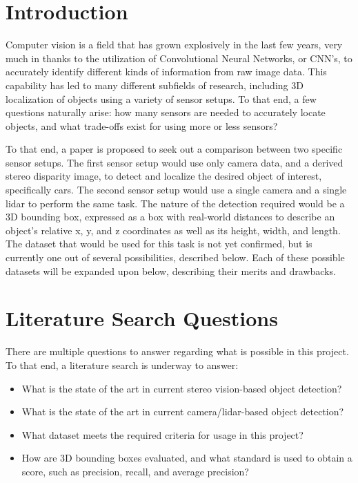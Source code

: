 \section{Introduction}
Computer vision is a field that has grown explosively in the last few years, very much in thanks to the utilization of Convolutional Neural Networks, or CNN's, to accurately identify different kinds of information from raw image data. This capability has led to many different subfields of research, including 3D localization of objects using a variety of sensor setups. To that end, a few questions naturally arise: how many sensors are needed to accurately locate objects, and what trade-offs exist for using more or less sensors?

To that end, a paper is proposed to seek out a comparison between two specific sensor setups. The first sensor setup would use only camera data, and a derived stereo disparity image, to detect and localize the desired object of interest, specifically cars. The second sensor setup would use a single camera and a single lidar to perform the same task. The nature of the detection required would be a 3D bounding box, expressed as a box with real-world distances to describe an object's relative x, y, and z coordinates as well as its height, width, and length. The dataset that would be used for this task is not yet confirmed, but is currently one out of several possibilities, described below. Each of these possible datasets will be expanded upon below, describing their merits and drawbacks.

\section{Literature Search Questions}
There are multiple questions to answer regarding what is possible in this project. To that end, a literature search is underway to answer:

\begin{itemize} \itemsep=-0.5em
\item What is the state of the art in current stereo vision-based object detection?
\item What is the state of the art in current camera/lidar-based object detection?
\item What dataset meets the required criteria for usage in this project?
\item How are 3D bounding boxes evaluated, and what standard is used to obtain a score, such as precision, recall, and average precision?
\end{itemize}

